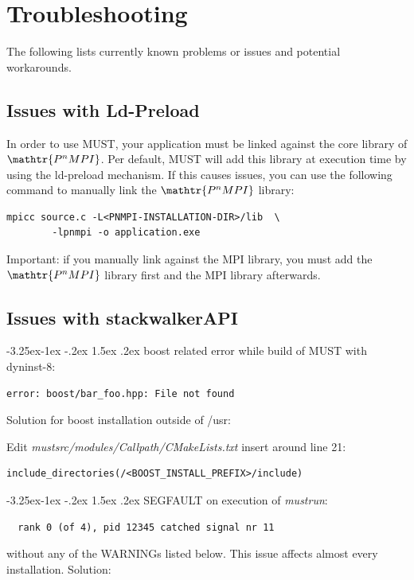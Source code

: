 \documentclass[english]{scrartcl}
\makeatletter
\newcommand{\pnmpi}{$\mathop{\mathtr{P^nMPI}}\nolimits$\xspace}
\renewcommand\paragraph{\@startsection{paragraph}{4}{\z@}%
  {-3.25ex\@plus -1ex \@minus -.2ex}%
  {1.5ex \@plus .2ex}%
  {\normalfont\normalsize\bfseries}}
\makeatother
\begin{document}
\section{Troubleshooting}

The following lists currently known problems or issues and potential
workarounds.

\subsection{Issues with Ld-Preload}
In order to use MUST, your application must be linked against the core library of
\pnmpi. Per default, MUST will add this library at execution time by using the
ld-preload mechanism. If this causes issues, you can use the following
command to manually link the \pnmpi library:
\begin{verbatim}
mpicc source.c -L<PNMPI-INSTALLATION-DIR>/lib  \
        -lpnmpi -o application.exe
\end{verbatim}

Important: if you manually link against the MPI library, you must add the \pnmpi
library first and the MPI library afterwards.

\subsection{Issues with stackwalkerAPI}
\label{subsect:dyninst-issues}

\paragraph{boost related error while build of MUST with dyninst-8:}
\begin{verbatim}
error: boost/bar_foo.hpp: File not found
\end{verbatim}
Solution for boost installation outside of /usr:

Edit \emph{mustsrc/modules/Callpath/CMakeLists.txt} insert around line 21:
\begin{verbatim}
include_directories(/<BOOST_INSTALL_PREFIX>/include)
\end{verbatim}

\paragraph{SEGFAULT on execution of \emph{mustrun}:}
\begin{verbatim}
  rank 0 (of 4), pid 12345 catched signal nr 11
\end{verbatim}
without any of the WARNINGs listed below. This issue affects almost every installation.\newline\newline
Solution:
\end{document}

